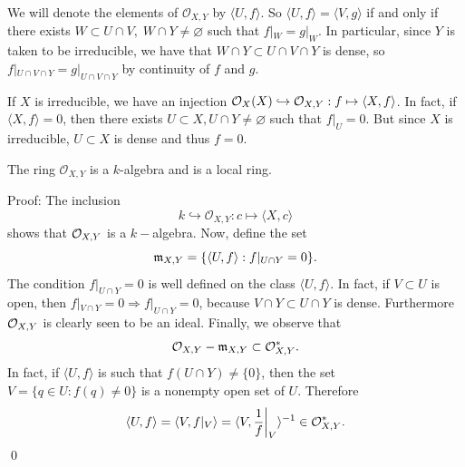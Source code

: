 \begin{notation}
    We will denote the elements of $\mathcal{O}_{X,Y}$ by $\langle U,f\rangle$. So 
    $\langle U,f\rangle=\langle V,g\rangle$ if and only if there exists $W\subset U\cap V,\; W\cap Y\neq\varnothing$ 
    such that $f|_W=g|_W$. 
    In particular, since $Y$ is taken to be irreducible, we have that $W\cap Y \subset U\cap V\cap Y$ is dense, so 
    $f|_{U\cap V\cap Y}=g|_{U\cap V\cap Y}$ by continuity of $f$ and $g$.
\end{notation}

\begin{remark}
    If $X$ is irreducible,
    we have an injection $\mathcal{O}_X(X)\hookrightarrow \mathcal{O}_{X,Y}:f\mapsto \langle X,f\rangle$. In fact, if 
    $\langle X,f\rangle = 0$, then there exists $U\subset X,U\cap Y\neq\varnothing$ such that $f|_U=0$. 
    But since $X$ is irreducible, $U\subset X$ is dense and thus $f=0$. 
\end{remark}

\begin{dang}
    \begin{proposition}
        The ring $\mathcal{O}_{X,Y}$ is a $k$-algebra and is a local ring.
    \end{proposition}
\end{dang}
Proof: The inclusion 
\begin{equation}
    k \hookrightarrow\mathcal{O}_{X,Y}:c\mapsto \langle X,c\rangle
\end{equation}
shows that $\mathcal{O}_{X,Y}$ is a $k-$algebra. Now, define the set 
\begin{equation}
    \mathfrak{m}_{X,Y} =\{\langle U,f\rangle: f|_{U\cap Y}=0\}.
\end{equation}
The condition $f|_{U\cap Y}=0$ is well defined on the class $\langle U,f\rangle$. In fact, if 
$V\subset U$ is open, then $f|_{V\cap Y}=0\Rightarrow f|_{U\cap Y}=0$, because $V\cap Y\subset U\cap Y$ is dense. Furthermore 
$\mathcal{O}_{X,Y}$ is clearly seen to be an ideal. Finally, we observe that 
\begin{equation}
    \mathcal{O}_{X,Y}-\mathfrak{m}_{X,Y}\subset\mathcal{O}_{X,Y}^*.
\end{equation}
In fact, if $\langle U,f\rangle$ is such that $f(U\cap Y)\neq\{0\}$, then the set 
$V=\{q\in U: f(q)\neq0\}$ is a nonempty open set of $U$. Therefore 
\begin{equation}
    \langle U,f\rangle = \langle V,f|_V\rangle = \langle V,\frac{1}{f}\bigg|_V\rangle ^{-1}\in\mathcal{O}_{X,Y}^*.
\end{equation}
\qed 


